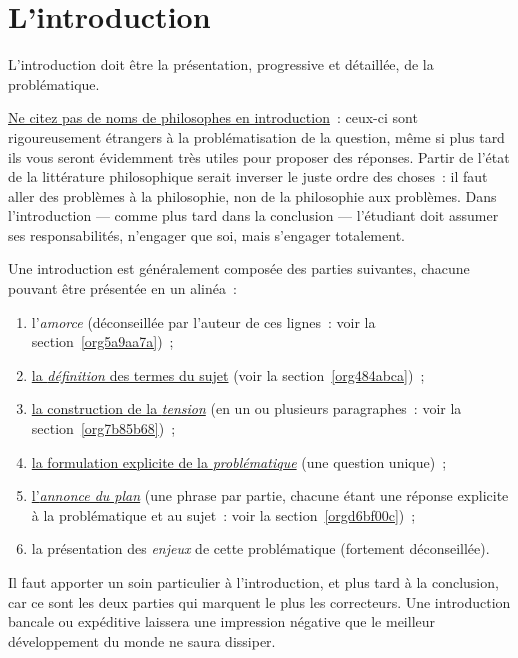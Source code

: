 \documentclass[a4paper,12pt]{article}
\begin{document}
\section{L'introduction}
\label{sec:org574c0c6}
\label{orgd8efc85}

L'introduction doit être la présentation, progressive et détaillée, de
la problématique.

\uline{Ne citez pas de noms de philosophes en introduction} : ceux-ci sont
rigoureusement étrangers à la problématisation de la question, même si
plus tard ils vous seront évidemment très utiles pour proposer des
réponses. Partir de l'état de la littérature philosophique serait
inverser le juste ordre des choses : il faut aller des problèmes à la
philosophie, non de la philosophie aux problèmes. Dans l'introduction
--- comme plus tard dans la conclusion --- l'étudiant doit assumer ses
responsabilités, n'engager que soi, mais s'engager totalement. 

Une introduction est généralement composée des parties suivantes,
chacune pouvant être présentée en un alinéa :

\begin{enumerate}
\item l'\emph{amorce} (déconseillée par l'auteur de ces lignes : voir la
section \ref{org5a9aa7a}) ;

\item \uline{la \emph{définition} des termes du sujet} (voir la section \ref{org484abca}) ;

\item \uline{la construction de la \emph{tension}} (en un ou plusieurs paragraphes :
voir la section \ref{org7b85b68}) ;

\item \uline{la formulation explicite de la \emph{problématique}} (une question
unique) ;

\item \uline{l'\emph{annonce du plan}} (une phrase par partie, chacune étant une
réponse explicite à la problématique et au sujet : voir la
section \ref{orgd6bf00c}) ;

\item la présentation des \emph{enjeux} de cette problématique (fortement
déconseillée).
\end{enumerate}

Il faut apporter un soin particulier à l'introduction, et plus tard à la
conclusion, car ce sont les deux parties qui marquent le plus les
correcteurs. Une introduction bancale ou expéditive laissera une
impression négative que le meilleur développement du monde ne saura
dissiper.
\end{document}
